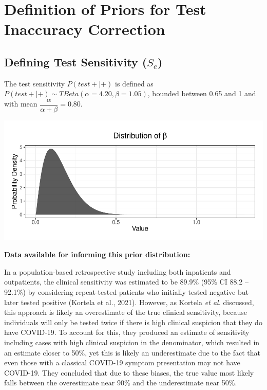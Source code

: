 \documentclass[12pt,twoside]{smiththesis}
\begin{document}
\hypertarget{definition-of-priors-for-test-inaccuracy-correction}{%
\section{Definition of Priors for Test Inaccuracy Correction}\label{definition-of-priors-for-test-inaccuracy-correction}}

\hypertarget{defining-test-sensitivity-s_e}{%
\subsection{\texorpdfstring{Defining Test Sensitivity (\(S_e\))}{Defining Test Sensitivity (S\_e)}}\label{defining-test-sensitivity-s_e}}

The test sensitivity \(P(test + | +)\) is defined as \(P(test +|+ )\sim TBeta(\alpha = 4.20, \beta = 1.05)\), bounded between 0.65 and 1 and with mean \(\dfrac{\alpha}{\alpha + \beta} = 0.80\).
\begin{center}\includegraphics[width=0.8\linewidth]{thesis_files/figure-latex/unnamed-chunk-56-1} \end{center}

\textbf{Data available for informing this prior distribution:}

In a population-based retrospective study including both inpatients and outpatients, the clinical sensitivity was estimated to be 89.9\% (95\% CI 88.2 -- 92.1\%) by considering repeat-tested patients who initially tested negative but later tested positive (Kortela et al., 2021). However, as Kortela \emph{et al.} discussed, this approach is likely an overestimate of the true clinical sensitivity, because individuals will only be tested twice if there is high clinical suspicion that they do have COVID-19. To account for this, they produced an estimate of sensitivity including cases with high clinical suspicion in the denominator, which resulted in an estimate closer to 50\%, yet this is likely an underestimate due to the fact that even those with a classical COVID-19 symptom presentation may not have COVID-19. They concluded that due to these biases, the true value most likely falls between the overestimate near 90\% and the underestimate near 50\%.
\end{document}
